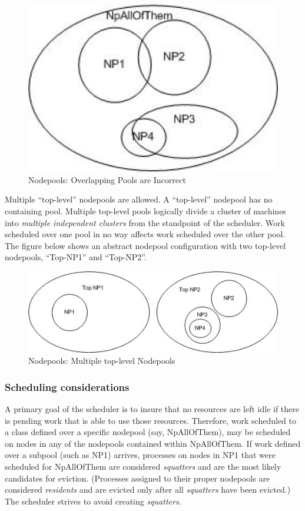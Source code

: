     \begin{figure}[H]
      \centering
      \includegraphics[width=5.5in]{images/Nodepool2.jpg}
      \caption{Nodepools: Overlapping Pools are Incorrect}
      \label{fig:Nodepools2}
    \end{figure}

    Multiple ``top-level'' nodepools are allowed.  A ``top-level'' nodepool has no containing
    pool.  Multiple top-level pools logically divide a cluster of machines into {\em multiple
      independent clusters} from the standpoint of the scheduler.  Work scheduled over one
    pool in no way affects work scheduled over the other pool.  The figure below shows an
    abstract nodepool configuration with two top-level nodepools, ``Top-NP1'' and ``Top-NP2''.
    \begin{figure}[H]
      \centering
      \includegraphics[width=5.5in]{images/Nodepool3.jpg}
      \caption{Nodepools: Multiple top-level Nodepools}
      \label{fig:Nodepools3}
    \end{figure}

\subsubsection{Scheduling considerations}
    A primary goal of the scheduler is to insure that no resources are left idle if there
    is pending work that is able to use those resources.  Therefore, work scheduled to
    a class defined over a specific nodepool (say, NpAllOfThem), may be scheduled on nodes
    in any of the nodepools contained within NpAllOfThem.  If work defined over a
    subpool (such as NP1) arrives, processes on nodes in NP1 that were scheduled for
    NpAllOfThem are considered {\em squatters} and are the most likely candidates for
    eviction. (Processes assigned to their proper nodepools are considered {\em residents}
    and are evicted only after all {\em squatters} have been evicted.)  The scheduler strives
    to avoid creating {\em squatters}.

